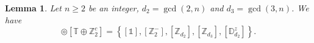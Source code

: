 \documentclass[11pt,a4paper]{amsart}
\newtheorem{lem}[thm]{Lemma}
\theoremstyle{definition}
\newcommand{\ZZ}{\mathbb{Z}}                %
\newcommand{\octa}{\mathbb{O}}              %
\newcommand{\ico}{\mathbb{I}}               %
\newcommand{\tetra}{\mathbb{T}}             %
\newcommand{\DD}{\mathbb{D}}                %
\newcommand{\1}{\mathds{1}}		            %
\newcommand{\set}[1]{\left\{#1\right\}}     %
\newcommand{\Dnz}{\DD_n^z}
\newcommand{\red}[1]{\textcolor{red}{#1}}
\begin{document}
\begin{lem}
  Let $n\geq 2$ be an integer, $d_2=\gcd(2,n)$ and $d_3=\gcd(3,n)$. We have
  \begin{equation*}
  [\Dnz] \circledcirc [\tetra \oplus \ZZ_2^c]  =\set{[\1],[\ZZ_{2}^{-}],[\ZZ_{d_2}],[\ZZ_{d_3}],[\DD_{d_2}^{z}]}.
  \end{equation*}
\end{lem}
\end{document}
